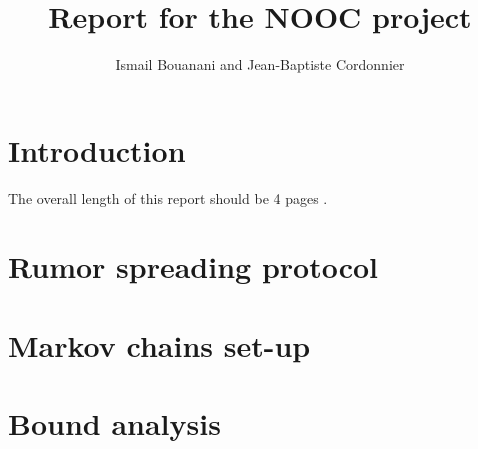 \documentclass[10pt,journal,a4paper]{IEEEtran}
\begin{document}
%
\title{Report for the NOOC project}
\author{Ismail Bouanani and Jean-Baptiste Cordonnier}
%
% 


\maketitle
\IEEEdisplaynotcompsoctitleabstractindextext

\section{Introduction}

The overall length of this report should be 4 pages \cite{GuoSun}. 


\section{Rumor spreading protocol}

\section{Markov chains set-up}

\section{Bound analysis}


\end{document}
